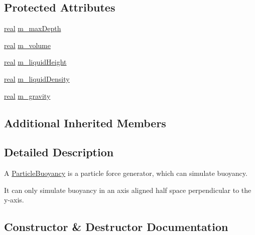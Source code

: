 \subsection*{Protected Attributes}
\begin{DoxyCompactItemize}
\item 
\mbox{\hyperlink{namespacer3_ab2016b3e3f743fb735afce242f0dc1eb}{real}} \mbox{\hyperlink{classr3_1_1_particle_buoyancy_a6e79de3d4dc7861fefc3aae9a08aab00}{m\+\_\+max\+Depth}}
\item 
\mbox{\hyperlink{namespacer3_ab2016b3e3f743fb735afce242f0dc1eb}{real}} \mbox{\hyperlink{classr3_1_1_particle_buoyancy_ade7d34f053371dadc2113563760599c9}{m\+\_\+volume}}
\item 
\mbox{\hyperlink{namespacer3_ab2016b3e3f743fb735afce242f0dc1eb}{real}} \mbox{\hyperlink{classr3_1_1_particle_buoyancy_a4fddd40b8ed38a245807f1ff6ebf374e}{m\+\_\+liquid\+Height}}
\item 
\mbox{\hyperlink{namespacer3_ab2016b3e3f743fb735afce242f0dc1eb}{real}} \mbox{\hyperlink{classr3_1_1_particle_buoyancy_a6a62107ee9e97a640371bf3a1aaf92cc}{m\+\_\+liquid\+Density}}
\item 
\mbox{\hyperlink{namespacer3_ab2016b3e3f743fb735afce242f0dc1eb}{real}} \mbox{\hyperlink{classr3_1_1_particle_buoyancy_a619b460c0ac8b80c4470f2784f81cc8d}{m\+\_\+gravity}}
\end{DoxyCompactItemize}
\subsection*{Additional Inherited Members}


\subsection{Detailed Description}
A \mbox{\hyperlink{classr3_1_1_particle_buoyancy}{Particle\+Buoyancy}} is a particle force generator, which can simulate buoyancy. 

It can only simulate buoyancy in an axis aligned half space perpendicular to the y-\/axis. 

\subsection{Constructor \& Destructor Documentation}
\mbox{\label{classr3_1_1_particle_buoyancy_a32db81f5aba8e5d2a6990c56074e1557}} 
